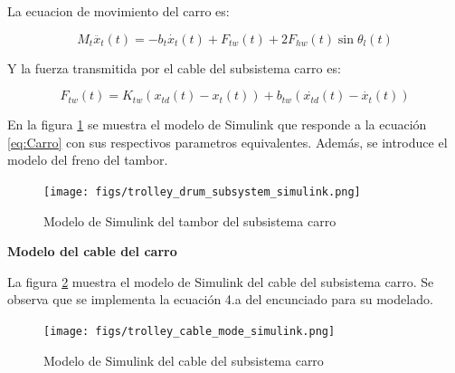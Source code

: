 \documentclass{article}
\begin{document}
            La ecuacion de movimiento del carro es:

            \begin{equation} \label{eq:Carro}
                M_t \ddot{x_{t}}(t) = - b_t \dot{x_{t}}(t) + F_{tw}(t) + 2F_{hw}(t)\sin{\theta_l(t)}
            \end{equation}

            Y la fuerza transmitida por el cable del subsistema carro es:

            \begin{equation} \label{eq:fuerzaCableCarro}
                F_{tw}(t) = K_{tw}(x_{td}(t) - x_t(t)) + b_{tw}(\dot{x_{td}}(t) - \dot{x_t}(t))
            \end{equation}

            En la figura \ref{fig:trolley_drum_mode_simulink} se muestra el modelo de Simulink que responde a la ecuación \ref{eq:Carro} con sus respectivos parametros equivalentes. Además, se introduce el modelo del freno del tambor.
            \begin{figure} [H]
                \centering
                \texttt{[image: figs/trolley\_drum\_subsystem\_simulink.png]}
                \caption{Modelo de Simulink del tambor del subsistema carro}
                \label{fig:trolley_drum_mode_simulink}
            \end{figure}

            \textbf{Modelo del cable del carro}

            La figura \ref{fig:trolley_cable_mode_simulink} muestra el modelo de Simulink del cable del subsistema carro. Se observa que se implementa la ecuación 4.a del encunciado para su modelado.
            
            \begin{figure} [H]
                \centering
                \texttt{[image: figs/trolley\_cable\_mode\_simulink.png]}
                \caption{Modelo de Simulink del cable del subsistema carro}
                \label{fig:trolley_cable_mode_simulink}
            \end{figure}



            
\end{document}
